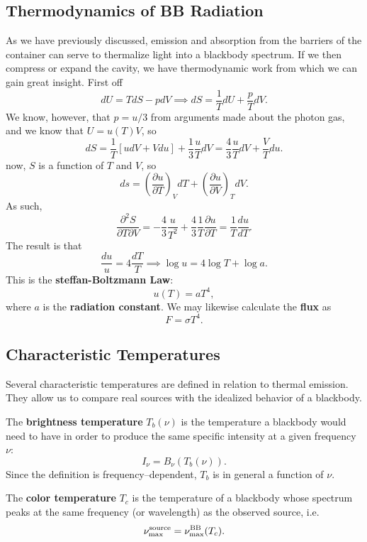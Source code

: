 \subsection{Thermodynamics of BB Radiation}
As we have previously discussed, emission and absorption from the barriers of the container can serve to thermalize light into a blackbody spectrum. If we then compress or expand the cavity, we have thermodynamic work from which we can gain great insight. First off
\[
dU = TdS - pdV \implies dS = \frac{1}{T}dU + \frac{p}{T} dV.
\]
We know, however, that $p = u/3$ from arguments made about the photon gas, and we know that $U=u(T) V$, so
\[
dS = \frac{1}{T}\left[u dV + Vdu\right] + \frac{1}{3}\frac{u}{T} dV =\frac{4}{3} \frac{u}{T} dV + \frac{V}{T}du.
\]
now, $S$ is a function of $T$ and $V$, so
\[
ds = \left(\frac{\partial u}{\partial T}\right)_V dT + \left(\frac{\partial u}{\partial V}\right)_T dV.
\]
As such,
\[
\frac{\partial^2 S}{\partial T \partial V} = -\frac{4}{3}\frac{u}{T^2} + \frac{4}{3} \frac{1}{T} \frac{\partial u}{\partial T} =  \frac{1}{T}\frac{du}{dT}.
\]
The result is that
\[
\frac{du}{u} = 4 \frac{dT}{T} \implies \log u = 4 \log T +\log a.
\]
This is the \textbf{steffan-Boltzmann Law}:
\[
u(T) = aT^4,
\]
where $a$ is the \textbf{radiation constant}. We may likewise calculate the \textbf{flux} as
\[
F = \sigma T^4.
\]

\subsection{Characteristic Temperatures}

Several characteristic temperatures are defined in relation to thermal emission.  
They allow us to compare real sources with the idealized behavior of a blackbody.

\vspace{0.5cm}
\begin{definition}
The \textbf{brightness temperature} $T_b(\nu)$ is the temperature a blackbody would need to have in order to produce the same specific intensity at a given frequency $\nu$:
\[
I_\nu = B_\nu\!\left(T_b(\nu)\right).
\]
Since the definition is frequency–dependent, $T_b$ is in general a function of $\nu$.
\end{definition}

\vspace{0.3cm}
\begin{definition}
The \textbf{color temperature} $T_c$ is the temperature of a blackbody whose spectrum peaks at the same frequency (or wavelength) as the observed source, i.e.
\[
\nu_{\rm max}^{\rm source} = \nu_{\rm max}^{\rm BB}(T_c).
\]
\end{definition}

